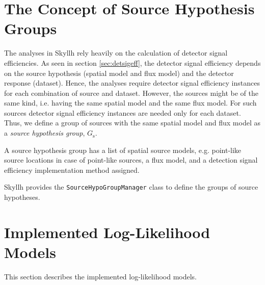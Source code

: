 \documentclass{article}
\newcommand{\code}[1]{\texttt{#1}}
\newcommand{\class}[1]{\colorbox{blue!30}{\code{#1}}}
\begin{document}
\section{The Concept of Source Hypothesis Groups}

The analyses in Skyllh rely heavily on the calculation of detector signal
efficiencies. As seen in section \ref{sec:detsigeff}, the detector signal
efficiency depends on the source hypothesis (spatial model and flux model)
and the detector response (dataset). Hence, the analyses require detector signal
efficiency instances for each combination of source and dataset.
However, the sources might be of the same kind, i.e. having the same spatial
model and the same flux model. For such sources detector signal efficiency
instances are needed only for each dataset. Thus, we define a group
of sources with the same spatial model and flux model as a \emph{source hypothesis group},
$G_{\mathrm{s}}$.

A source hypothesis group has a list of spatial source models, e.g. point-like source
locations in case of point-like sources, a flux model, and a detection signal
efficiency implementation method assigned.

Skyllh provides the \class{SourceHypoGroupManager} class to define the groups of
source hypotheses.

\section{Implemented Log-Likelihood Models}
This section describes the implemented log-likelihood models. \cite{TimeDepPSSearchMethods2010}

%
%



\end{document}

